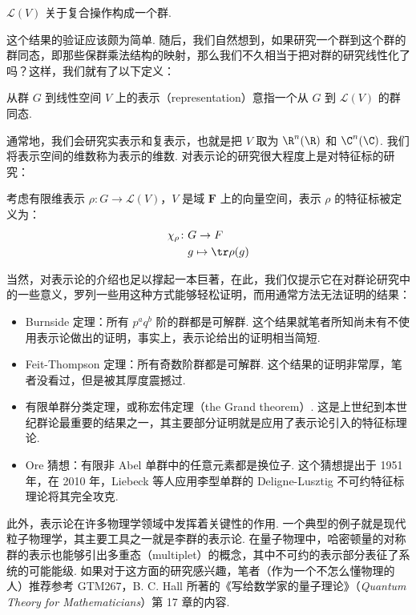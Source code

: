\begin{lemma}
    $\mathcal{L}(V)$ 关于复合操作构成一个群.
\end{lemma}

这个结果的验证应该颇为简单. 随后，我们自然想到，如果研究一个群到这个群的群同态，即那些保群乘法结构的映射，那么我们不久相当于把对群的研究线性化了吗？这样，我们就有了以下定义：

\begin{definition}
    从群 $G$ 到线性空间 $V$ 上的表示（representation）意指一个从 $G$ 到 $\mathcal{L}(V)$ 的群同态.
\end{definition}

通常地，我们会研究实表示和复表示，也就是把 $V$ 取为 $\R^n(\R)$ 和 $\C^n(\C)$. 我们将表示空间的维数称为表示的维数. 对表示论的研究很大程度上是对特征标的研究：

\begin{definition}
    考虑有限维表示 $\rho: G \to \mathcal{L}(V)$，$V$ 是域 $\mathbf{F}$ 上的向量空间，表示 $\rho$ 的特征标被定义为：
    \begin{align*}
        \chi_\rho \colon & G \to F                 \\
                         & g  \mapsto  \tr \rho(g)
    \end{align*}
\end{definition}

当然，对表示论的介绍也足以撑起一本巨著，在此，我们仅提示它在对群论研究中的一些意义，罗列一些用这种方式能够轻松证明，而用通常方法无法证明的结果：
\begin{itemize}
    \item Burnside 定理：所有 $p^aq^b$ 阶的群都是可解群. 这个结果就笔者所知尚未有不使用表示论做出的证明，事实上，表示论给出的证明相当简短.

    \item Feit-Thompson 定理：所有奇数阶群都是可解群. 这个结果的证明非常厚，笔者没看过，但是被其厚度震撼过.

    \item 有限单群分类定理，或称宏伟定理（the Grand theorem）. 这是上世纪到本世纪群论最重要的结果之一，其主要部分证明就是应用了表示论引入的特征标理论.

    \item Ore 猜想：有限非 Abel 单群中的任意元素都是换位子. 这个猜想提出于 1951 年，在 2010 年，Liebeck 等人应用李型单群的 Deligne-Lusztig 不可约特征标理论将其完全攻克.
\end{itemize}

此外，表示论在许多物理学领域中发挥着关键性的作用. 一个典型的例子就是现代粒子物理学，其主要工具之一就是李群的表示论. 在量子物理中，哈密顿量的对称群的表示也能够引出多重态（multiplet）的概念，其中不可约的表示部分表征了系统的可能能级. 如果对于这方面的研究感兴趣，笔者（作为一个不怎么懂物理的人）推荐参考 GTM267，B. C. Hall 所著的《写给数学家的量子理论》（\textit{Quantum Theory for Mathematicians}）第 17 章的内容.

